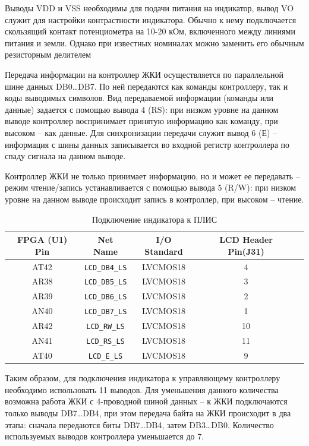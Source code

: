 Выводы VDD и VSS необходимы для подачи питания на индикатор, 
вывод VO служит для настройки контрастности индикатора. Обычно к 
нему подключается скользящий контакт потенциометра на 10-20 
кОм, включенного между линиями питания и земли. Однако при 
известных номиналах можно заменить его обычным резисторным 
делителем

Передача информации на контроллер ЖКИ осуществляется по 
параллельной шине данных DB0…DB7. 
По ней передаются как команды контроллеру, так и коды выводимых символов. 
Вид передаваемой информации (команды или данные) задается 
с помощью вывода 4 (RS): при низком уровне на данном выводе 
контроллер воспринимает принятую информацию как команду, при высоком – как данные. 
Для синхронизации передачи служит вывод 6 (Е) – 
информация с шины данных записывается во входной регистр контроллера 
по спаду сигнала на данном выводе.

Контроллер ЖКИ не только принимает информацию, но и может 
ее передавать – режим чтение/запись устанавливается с помощью 
вывода 5 (R/W): при низком уровне на данном выводе происходит 
запись в контроллер, при высоком – чтение.

\begin{table}[!ht]
	\begin{center}
		\begin{tabular}{c c c c c}
			\hline\hline
			FPGA (U1) Pin & Net Name &  I/O Standard & LCD Header Pin(J31) \\
			\hline
			AT42 & \verb|LCD_DB4_LS| & LVCMOS18 & 4 \\
			AR38 & \verb|LCD_DB5_LS| & LVCMOS18 & 3 \\
			AR39 & \verb|LCD_DB6_LS| & LVCMOS18 & 2 \\
			AN40 & \verb|LCD_DB7_LS| & LVCMOS18 & 1 \\
			AR42 & \verb|LCD_RW_LS| & LVCMOS18 & 10 \\
			AN41 & \verb|LCD_RS_LS| & LVCMOS18 & 11 \\
			AT40 & \verb|LCD_E_LS| & LVCMOS18 & 9 \\
			\hline
		\end{tabular}
		\caption{Подключение индикатора к ПЛИС}
		\label{LCD_TO_FPGA}
	\end{center}
\end{table}

Таким образом, для подключения индикатора к управляющему 
контроллеру необходимо использовать 11 выводов. Для уменьшения 
данного количества возможна работа ЖКИ с 4-проводной шиной 
данных – к ЖКИ подключаются только выводы DB7…DB4, при 
этом передача байта на ЖКИ происходит в два этапа: сначала передаются биты DB7…DB4, затем DB3…DB0. Количество используемых выводов контроллера уменьшается до 7.

